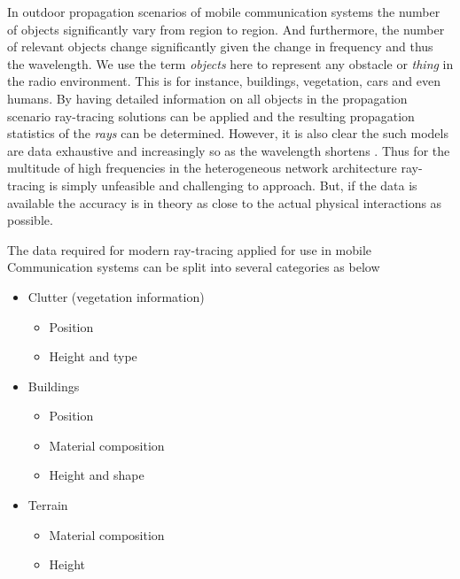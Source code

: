 In outdoor propagation scenarios of mobile communication systems the number of objects significantly vary from region to region. And furthermore, the number of relevant objects change significantly given the change in frequency and thus the wavelength. We use the term \emph{objects} here to represent any obstacle or \emph{thing} in the radio environment. This is for instance, buildings, vegetation, cars and even humans. By having detailed information on all objects in the propagation scenario ray-tracing solutions can be applied and the resulting propagation statistics of the \emph{rays} can be determined. However, it is also clear the such models are data exhaustive and increasingly so as the wavelength shortens \cite{Tse2005FundamentalsCommunication}. Thus for the multitude of high frequencies in the heterogeneous network architecture ray-tracing is simply unfeasible and challenging to approach. But, if the data is available the accuracy is in theory as close to the actual physical interactions as possible.

The data required for modern ray-tracing applied for use in mobile Communication systems can be split into several categories as below
\begin{itemize}
    \item Clutter (vegetation information)
    \begin{itemize}
        \item Position
        \item Height and type
    \end{itemize}
    \item Buildings
    \begin{itemize}
        \item Position
        \item Material composition
        \item Height and shape
    \end{itemize}
    \item Terrain
    \begin{itemize}
        \item Material composition
        \item Height
    \end{itemize}
\end{itemize}


